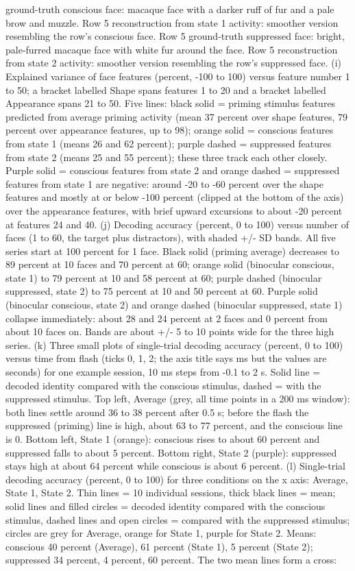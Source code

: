 \documentclass{article}
\begin{document}
ground-truth conscious face: macaque face with a darker ruff of fur and a pale brow and muzzle. Row 5 reconstruction from state 1 activity: smoother version resembling the row's conscious face. Row 5 ground-truth suppressed face: bright, pale-furred macaque face with white fur around the face. Row 5 reconstruction from state 2 activity: smoother version resembling the row's suppressed face. (i) Explained variance of face features (percent, -100 to 100) versus feature number 1 to 50; a bracket labelled Shape spans features 1 to 20 and a bracket labelled Appearance spans 21 to 50. Five lines: black solid = priming stimulus features predicted from average priming activity (mean 37 percent over shape features, 79 percent over appearance features, up to 98); orange solid = conscious features from state 1 (means 26 and 62 percent); purple dashed = suppressed features from state 2 (means 25 and 55 percent); these three track each other closely. Purple solid = conscious features from state 2 and orange dashed = suppressed features from state 1 are negative: around -20 to -60 percent over the shape features and mostly at or below -100 percent (clipped at the bottom of the axis) over the appearance features, with brief upward excursions to about -20 percent at features 24 and 40. (j) Decoding accuracy (percent, 0 to 100) versus number of faces (1 to 60, the target plus distractors), with shaded +/- SD bands. All five series start at 100 percent for 1 face. Black solid (priming average) decreases to 89 percent at 10 faces and 70 percent at 60; orange solid (binocular conscious, state 1) to 79 percent at 10 and 58 percent at 60; purple dashed (binocular suppressed, state 2) to 75 percent at 10 and 50 percent at 60. Purple solid (binocular conscious, state 2) and orange dashed (binocular suppressed, state 1) collapse immediately: about 28 and 24 percent at 2 faces and 0 percent from about 10 faces on. Bands are about +/- 5 to 10 points wide for the three high series. (k) Three small plots of single-trial decoding accuracy (percent, 0 to 100) versus time from flash (ticks 0, 1, 2; the axis title says ms but the values are seconds) for one example session, 10 ms steps from -0.1 to 2 s. Solid line = decoded identity compared with the conscious stimulus, dashed = with the suppressed stimulus. Top left, Average (grey, all time points in a 200 ms window): both lines settle around 36 to 38 percent after 0.5 s; before the flash the suppressed (priming) line is high, about 63 to 77 percent, and the conscious line is 0. Bottom left, State 1 (orange): conscious rises to about 60 percent and suppressed falls to about 5 percent. Bottom right, State 2 (purple): suppressed stays high at about 64 percent while conscious is about 6 percent. (l) Single-trial decoding accuracy (percent, 0 to 100) for three conditions on the x axis: Average, State 1, State 2. Thin lines = 10 individual sessions, thick black lines = mean; solid lines and filled circles = decoded identity compared with the conscious stimulus, dashed lines and open circles = compared with the suppressed stimulus; circles are grey for Average, orange for State 1, purple for State 2. Means: conscious 40 percent (Average), 61 percent (State 1), 5 percent (State 2); suppressed 34 percent, 4 percent, 60 percent. The two mean lines form a cross: 
\end{document}
